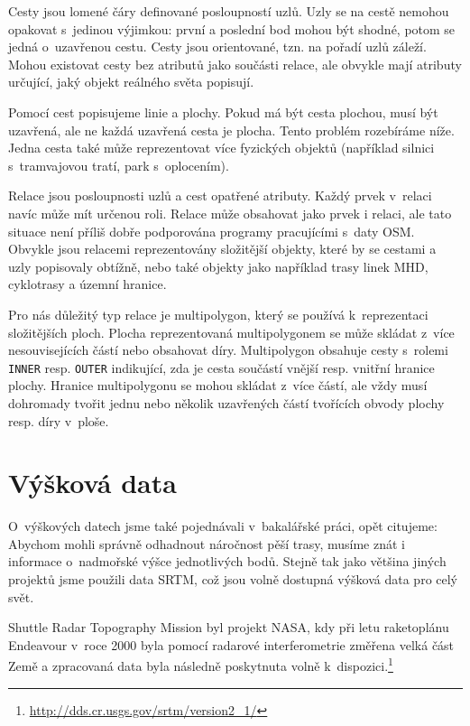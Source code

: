 {\tuc Cesty} jsou lomené čáry definované posloupností uzlů. Uzly se na cestě nemohou opakovat
s~jedinou výjimkou: první a poslední bod mohou být shodné, potom se jedná
o~uzavřenou cestu. Cesty jsou orientované, tzn. na pořadí uzlů záleží. Mohou
existovat cesty bez atributů jako součásti relace, ale obvykle mají atributy
určující, jaký objekt reálného světa popisují.

Pomocí cest popisujeme linie a plochy. Pokud má být cesta plochou, musí být
uzavřená, ale ne každá uzavřená cesta je plocha. Tento problém rozebíráme níže.
Jedna cesta také může reprezentovat více fyzických objektů (například silnici
s~tramvajovou tratí, park s~oplocením).

{\tuc Relace} jsou posloupnosti uzlů a cest opatřené atributy. Každý prvek
v~relaci navíc může mít určenou roli. Relace může obsahovat jako prvek i relaci,
ale tato situace není příliš dobře podporována programy pracujícími s~daty OSM. 
Obvykle jsou relacemi reprezentovány složitější objekty, které by se cestami a
uzly popisovaly obtížně, nebo také  objekty jako například
trasy linek MHD, cyklotrasy a územní hranice.

Pro nás důležitý typ relace je {\tuc multipolygon}, který se používá k~reprezentaci
složitějších ploch. Plocha reprezentovaná multipolygonem se může skládat z~více
nesouvisejících částí nebo obsahovat díry. Multipolygon obsahuje cesty s~rolemi 
\verb|INNER| resp. \verb|OUTER| indikující, zda je cesta součástí vnější resp.
vnitřní hranice plochy. Hranice multipolygonu se mohou skládat z~více částí, ale
vždy musí dohromady tvořit jednu nebo několik uzavřených částí tvořících obvody 
plochy resp. díry v~ploše.

\section{Výšková data}
O~výškových datech jsme také pojednávali v~bakalářské práci, opět
citujeme\cite{bakalarka}:
Abychom mohli správně odhadnout náročnost pěší trasy, musíme znát i informace
o~nadmořské výšce jednotlivých bodů. Stejně tak jako většina jiných projektů jsme
použili data SRTM\cite{SRTM}, což jsou volně dostupná výšková data pro celý
svět.

Shuttle Radar Topography Mission byl projekt NASA, kdy při letu raketoplánu
Endeavour v~roce 2000 byla pomocí radarové interferometrie změřena velká část
Země a zpracovaná data byla následně poskytnuta volně k~dispozici.\footnote{\url{http://dds.cr.usgs.gov/srtm/version2_1/}} 

